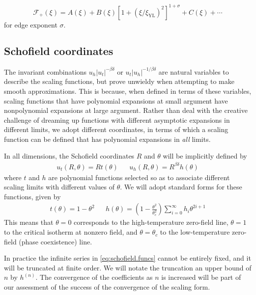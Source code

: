 \documentclass[
  aps,
  pre,
  preprint,
  longbibliography,
  floatfix
]{revtex4-2}
\begin{document}
\begin{equation}
  \mathcal F_+(\xi)
  =A(\xi) +B(\xi)[1+(\xi/\xi_{\mathrm{YL}})^2]^{1+\sigma}+C(\xi)+\cdots
\end{equation}
for edge exponent $\sigma$.

\cite{Cardy_1985_Conformal}
\cite{Connelly_2020_Universal}
\cite{An_2016_Functional}
\cite{Zambelli_2017_Lee-Yang}
\cite{Gliozzi_2014_Critical}

\subsection{Schofield coordinates}

The invariant combinations $u_h|u_t|^{-\beta\delta}$ or
$u_t|u_h|^{-1/\beta\delta}$ are natural variables to describe the scaling
functions, but prove unwieldy when attempting to make smooth approximations.
This is because, when defined in terms of these variables, scaling functions
that have polynomial expansions at small argument have nonpolynomial expansions
at large argument. Rather than deal with the creative challenge of dreaming up
functions with different asymptotic expansions in different limits, we adopt
different coordinates, in terms of which a scaling function can be defined that
has polynomial expansions in \emph{all} limits.

In all dimensions, the Schofield coordinates $R$ and $\theta$ will be implicitly defined by
\begin{align} \label{eq:schofield}
  u_t(R, \theta) = Rt(\theta)
  &&
  u_h(R, \theta) = R^{\beta\delta}h(\theta)
\end{align}
where $t$ and $h$ are polynomial functions selected so as to associate different scaling limits with different values of $\theta$. We will adopt standard forms for these functions, given by
\begin{align} \label{eq:schofield.funcs}
  t(\theta)=1-\theta^2
  &&
  h(\theta)=\left(1-\frac{\theta^2}{\theta_c^2}\right)\sum_{i=0}^\infty h_i\theta^{2i+1}
\end{align}
This means that $\theta=0$ corresponds to the high-temperature zero-field line,
$\theta=1$ to the critical isotherm at nonzero field, and $\theta=\theta_c$ to
the low-temperature zero-field (phase coexistence) line.

In practice the infinite series in \eqref{eq:schofield.funcs} cannot be
entirely fixed, and it will be truncated at finite order. We will notate the
truncation an upper bound of $n$ by $h^{(n)}$. The convergence of the
coefficients as $n$ is increased will be part of our assessment of the success
of the convergence of the scaling form.
\end{document}

